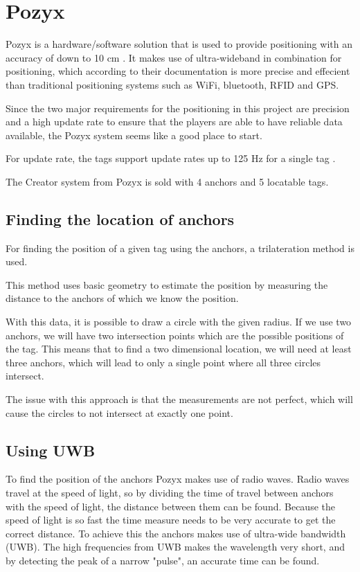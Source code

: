 \section{Pozyx}
Pozyx is a hardware/software solution that is used to provide positioning with an accuracy of down to 10 cm \cite{pozyx}.
It makes use of ultra-wideband in combination for positioning, which according to their documentation is more precise and effecient than traditional positioning systems such as WiFi, bluetooth, RFID and GPS.

Since the two major requirements for the positioning in this project are precision and a high update rate to ensure that the players are able to have reliable data available, the Pozyx system seems like a good place to start.

For update rate, the tags support update rates up to 125 Hz for a single tag \cite{pozyx}.

The Creator system from Pozyx is sold with 4 anchors and 5 locatable tags.

\subsection{Finding the location of anchors}
For finding the position of a given tag using the anchors, a trilateration method is used.

This method uses basic geometry to estimate the position by measuring the distance to the anchors of which we know the position.

With this data, it is possible to draw a circle with the given radius.
If we use two anchors, we will have two intersection points which are the possible positions of the tag.
This means that to find a two dimensional location, we will need at least three anchors, which will lead to only a single point where all three circles intersect.

The issue with this approach is that the measurements are not perfect, which will cause the circles to not intersect at exactly one point.

\subsection{Using UWB}
To find the position of the anchors Pozyx makes use of radio waves. 
Radio waves travel at the speed of light, so by dividing the time of travel between anchors with the speed of light, the distance between them can be found.
Because the speed of light is so fast the time measure needs to be very accurate to get the correct distance.
To achieve this the anchors makes use of ultra-wide bandwidth (UWB).
The high frequencies from UWB makes the wavelength very short, and by detecting the peak of a narrow "pulse", an accurate time can be found.